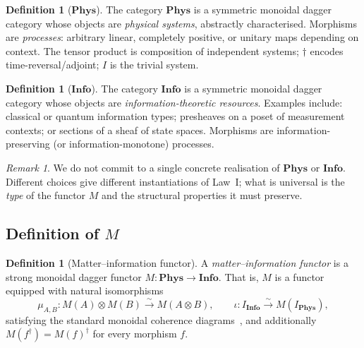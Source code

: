 \documentclass[12pt]{article}
\theoremstyle{definition}
\newtheorem{definition}[theorem]{Definition}
\theoremstyle{remark}
\newtheorem{remark}[theorem]{Remark}
\newcommand{\Phys}{\mathbf{Phys}}
\newcommand{\Info}{\mathbf{Info}}
\begin{document}
\begin{definition}[$\Phys$]
\label{def:phys}
The category $\Phys$ is a symmetric monoidal dagger category whose objects are \emph{physical systems}, abstractly characterised. Morphisms are \emph{processes}: arbitrary linear, completely positive, or unitary maps depending on context. The tensor product is composition of independent systems; $\dagger$ encodes time-reversal/adjoint; $I$ is the trivial system.
\end{definition}

\begin{definition}[$\Info$]
The category $\Info$ is a symmetric monoidal dagger category whose objects are \emph{information-theoretic resources}. Examples include: classical or quantum information types; presheaves on a poset of measurement contexts; or sections of a sheaf of state spaces. Morphisms are information-preserving (or information-monotone) processes.
\end{definition}

\begin{remark}
We do not commit to a single concrete realisation of $\Phys$ or $\Info$. Different choices give different instantiations of Law~I; what is universal is the \emph{type} of the functor $M$ and the structural properties it must preserve.
\end{remark}

\subsection{Definition of \texorpdfstring{$M$}{M}}

\begin{definition}[Matter--information functor]
\label{def:matter-info}
A \emph{matter--information functor} is a strong monoidal dagger functor $M : \Phys \to \Info$. That is, $M$ is a functor equipped with natural isomorphisms
\[
\mu_{A,B} : M(A) \otimes M(B) \xrightarrow{\sim} M(A \otimes B),
\qquad
\iota : I_{\Info} \xrightarrow{\sim} M(I_{\Phys}),
\]
satisfying the standard monoidal coherence diagrams~\cite{maclane1998}, and additionally $M(f^\dagger) = M(f)^\dagger$ for every morphism $f$.
\end{definition}
\end{document}
